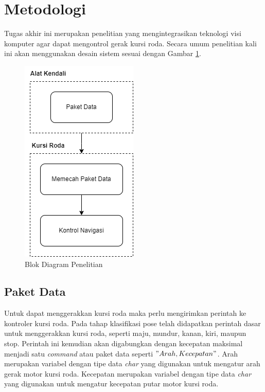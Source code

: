 \section{Metodologi}
\label{sec:metodologi}


Tugas akhir ini merupakan penelitian yang mengintegrasikan teknologi visi komputer agar dapat mengontrol gerak kursi roda. Secara umum penelitian kali ini akan menggunakan desain sistem sesuai dengan Gambar \ref{fig:Metodologi Penelitian}.

\begin{figure} [ht] \centering
    \includegraphics[scale=0.8]{gambar/DeskripsiSistem.png}
    \caption{Blok Diagram Penelitian}
    \label{fig:Metodologi Penelitian}
\end{figure}

\subsection{Paket Data}
Untuk dapat menggerakkan kursi roda maka perlu mengirimkan perintah ke kontroler kursi roda. Pada tahap klasifikasi pose telah didapatkan perintah dasar untuk menggerakkan kursi roda, seperti maju, mundur, kanan, kiri, maupun stop. Perintah ini kemudian akan digabungkan dengan kecepatan maksimal menjadi satu \emph{command} atau paket data seperti \("Arah, Kecepatan"\). Arah merupakan variabel dengan tipe data \emph{char} yang digunakan untuk mengatur arah gerak motor kursi roda. Kecepatan merupakan variabel dengan tipe data \emph{char} yang digunakan untuk mengatur kecepatan putar motor kursi roda.

